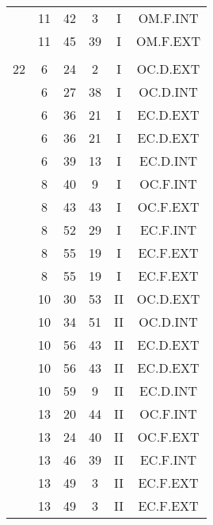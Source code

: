 \documentclass[12pt, a4paper]{article}
\begin{document}
\begin{multicols}{3}
{\begin{tabular}{c c c c c c}
	 	 	 	 & 11 & 42 & 3 & I & OM.F.INT\\%
	 	 	 	 & 11 & 45 & 39 & I & OM.F.EXT\\%
	 	 	 	 & & & & & \\%
	 	 	 	22 & 6 & 24 & 2 & I & OC.D.EXT\\%
	 	 	 	 & 6 & 27 & 38 & I & OC.D.INT\\%
	 	 	 	 & 6 & 36 & 21 & I & EC.D.EXT\\%
	 	 	 	 & 6 & 36 & 21 & I & EC.D.EXT\\%
	 	 	 	 & 6 & 39 & 13 & I & EC.D.INT\\%
	 	 	 	 & 8 & 40 & 9 & I & OC.F.INT\\%
	 	 	 	 & 8 & 43 & 43 & I & OC.F.EXT\\%
	 	 	 	 & 8 & 52 & 29 & I & EC.F.INT\\%
	 	 	 	 & 8 & 55 & 19 & I & EC.F.EXT\\%
	 	 	 	 & 8 & 55 & 19 & I & EC.F.EXT\\%
	 	 	 	 & 10 & 30 & 53 & II & OC.D.EXT\\%
	 	 	 	 & 10 & 34 & 51 & II & OC.D.INT\\%
	 	 	 	 & 10 & 56 & 43 & II & EC.D.EXT\\%
	 	 	 	 & 10 & 56 & 43 & II & EC.D.EXT\\%
	 	 	 	 & 10 & 59 & 9 & II & EC.D.INT\\%
	 	 	 	 & 13 & 20 & 44 & II & OC.F.INT\\%
	 	 	 	 & 13 & 24 & 40 & II & OC.F.EXT\\%
	 	 	 	 & 13 & 46 & 39 & II & EC.F.INT\\%
	 	 	 	 & 13 & 49 & 3 & II & EC.F.EXT\\%
	 	 	 	 & 13 & 49 & 3 & II & EC.F.EXT\\%
	 	 \end{tabular}
 	}
\end{multicols}
\end{document}
